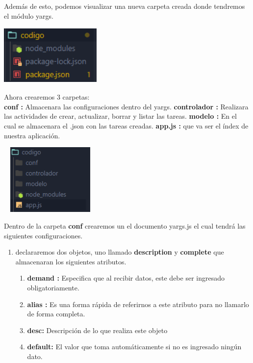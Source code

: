 \documentclass{report}
\begin{document}
   
  Además de esto, podemos visualizar una nueva carpeta creada donde tendremos el módulo yargs.
  \begin{center}
    \includegraphics[width=5cm, height=3cm]{4.png}
  \end{center}

Ahora crearemos 3 carpetas:\\
\textbf{conf : } Almacenara las configuraciones dentro del yargs.
\textbf{controlador : }Realizara las actividades de crear, actualizar, borrar y listar las tareas.
\textbf{modelo : }En el cual se almacenara el .json con las tareas creadas.
\textbf{app.js : }que va ser el índex de nuestra aplicación.
\begin{center}
  \includegraphics[width=5cm, height=3.5cm]{6.png}
\end{center}
    
Dentro de la carpeta \textbf{conf} crearemos un el documento yargs.js el cual tendrá las siguientes configuraciones.

\begin{enumerate}
  \item declararemos dos objetos, uno llamado \textbf{description} y \textbf{complete} que almacenaran los siguientes atributos.
  \begin{enumerate}
    \item \textbf{demand :} Especifica que al recibir datos, este debe ser ingresado obligatoriamente.
    \item \textbf{alias :} Es una forma rápida de referirnos a este atributo para no llamarlo de forma completa.
    \item \textbf{desc: }Descripción de lo que realiza este objeto
    \item \textbf{default: }El valor que toma automáticamente si no es ingresado ningún dato.
  \end{enumerate}
\end{enumerate}
\end{document}
